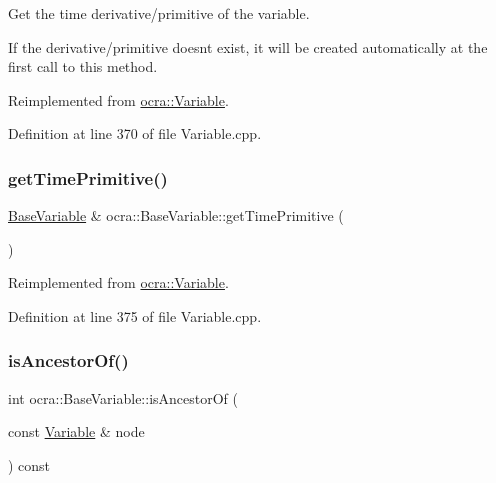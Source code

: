 Get the time derivative/primitive of the variable. 

If the derivative/primitive doesn\textquotesingle{}t exist, it will be created automatically at the first call to this method. 

Reimplemented from \hyperlink{classocra_1_1Variable_a06ee384364d5c6bd1ea4bc4b38d6268c}{ocra\+::\+Variable}.



Definition at line 370 of file Variable.\+cpp.

\hypertarget{classocra_1_1BaseVariable_aa985b0703fc0a2edcd66a7c4c4ee05e4}{}\label{classocra_1_1BaseVariable_aa985b0703fc0a2edcd66a7c4c4ee05e4} 
\subsubsection{\texorpdfstring{get\+Time\+Primitive()}{getTimePrimitive()}}
{\footnotesize\ttfamily \hyperlink{classocra_1_1BaseVariable}{Base\+Variable} \& ocra\+::\+Base\+Variable\+::get\+Time\+Primitive (\begin{DoxyParamCaption}{ }\end{DoxyParamCaption})\hspace{0.3cm}{\ttfamily [virtual]}}



Reimplemented from \hyperlink{classocra_1_1Variable_aca32d63e60dc79de340b2f122dad0dc5}{ocra\+::\+Variable}.



Definition at line 375 of file Variable.\+cpp.

\hypertarget{classocra_1_1BaseVariable_a66d07236f4d060273f3f46632dc851ac}{}\label{classocra_1_1BaseVariable_a66d07236f4d060273f3f46632dc851ac} 
\subsubsection{\texorpdfstring{is\+Ancestor\+Of()}{isAncestorOf()}}
{\footnotesize\ttfamily int ocra\+::\+Base\+Variable\+::is\+Ancestor\+Of (\begin{DoxyParamCaption}\item[{const \hyperlink{classocra_1_1Variable}{Variable} \&}]{node }\end{DoxyParamCaption}) const\hspace{0.3cm}{\ttfamily [virtual]}}



